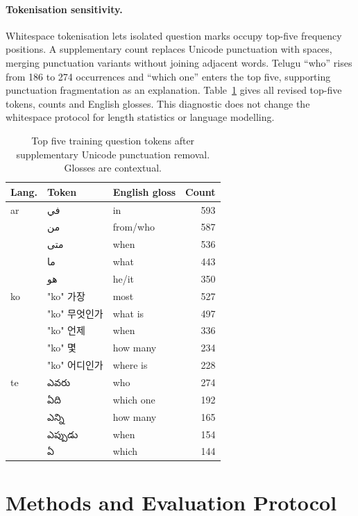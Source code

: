 \documentclass[11pt]{article}
\newcommand{\KO}[1]{{\koreanfont\XeTeXlinebreaklocale "ko" #1}}
\newcommand{\TE}[1]{{\telugufont #1}}
\newcommand{\AR}[1]{{\arabicfont\beginR #1\endR}}
\begin{document}
\paragraph{Tokenisation sensitivity.}
Whitespace tokenisation lets isolated question marks occupy top-five frequency positions. A supplementary count replaces Unicode punctuation with spaces, merging punctuation variants without joining adjacent words. Telugu ``who'' rises from 186 to 274 occurrences and ``which one'' enters the top five, supporting punctuation fragmentation as an explanation. Table~\ref{tab:tokens} gives all revised top-five tokens, counts and English glosses. This diagnostic does not change the whitespace protocol for length statistics or language modelling.

\begin{table}[!ht]
\centering\small\setlength{\tabcolsep}{4pt}
\begin{tabular}{lllr}
\toprule
Lang. & Token & English gloss & Count\\
\midrule
ar & \AR{في} & in & 593\\
 & \AR{من} & from/who & 587\\
 & \AR{متى} & when & 536\\
 & \AR{ما} & what & 443\\
 & \AR{هو} & he/it & 350\\
ko & \KO{가장} & most & 527\\
 & \KO{무엇인가} & what is & 497\\
 & \KO{언제} & when & 336\\
 & \KO{몇} & how many & 234\\
 & \KO{어디인가} & where is & 228\\
te & \TE{ఎవరు} & who & 274\\
 & \TE{ఏది} & which one & 192\\
 & \TE{ఎన్ని} & how many & 165\\
 & \TE{ఎప్పుడు} & when & 154\\
 & \TE{ఏ} & which & 144\\
\bottomrule
\end{tabular}
\caption{Top five training question tokens after supplementary Unicode punctuation removal. Glosses are contextual.}
\label{tab:tokens}
\end{table}

\section{Methods and Evaluation Protocol}
\end{document}

